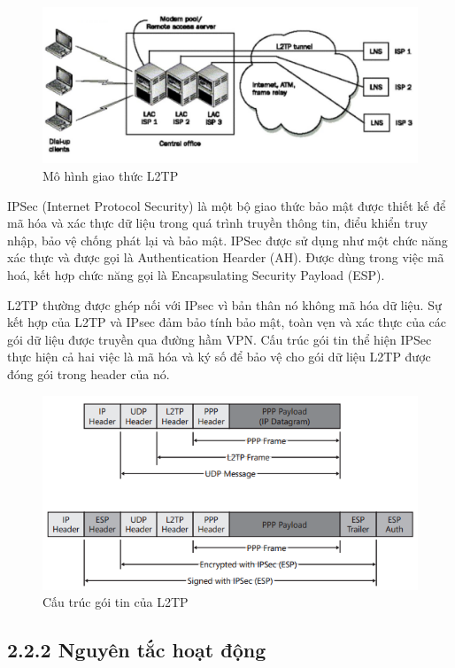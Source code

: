   \begin{figure}[htbp]
        \centering
        \includegraphics[width=0.8\linewidth]{img/l2tp.jpeg}
        \caption{Mô hình giao thức L2TP}
    \end{figure}

 IPSec (Internet Protocol Security) là một bộ giao thức bảo mật được thiết kế để mã hóa và xác thực dữ liệu trong quá trình truyền thông tin, điểu khiển truy nhập, bảo vệ chống phát lại và bảo mật. IPSec được sử dụng như một chức năng xác thực và được gọi là Authentication Hearder (AH). Được dùng trong việc mã hoá, kết hợp chức năng gọi là Encapsulating Security Payload (ESP).

 L2TP thường được ghép nối với IPsec vì bản thân nó không mã hóa dữ liệu. Sự kết hợp của L2TP và IPsec đảm bảo tính bảo mật, toàn vẹn và xác thực của các gói dữ liệu được truyền qua đường hầm VPN. Cấu trúc gói tin thể hiện IPSec thực hiện cả hai việc là mã hóa và ký số để bảo vệ cho gói dữ liệu L2TP được đóng gói trong header của nó.
 
 \begin{figure}[htbp]
        \centering
        \includegraphics[width=0.7\linewidth]{img/l2tp-packet-structure.png}
        \caption{Cấu trúc gói tin của L2TP}
    \end{figure}

 \subsection*{2.2.2 Nguyên tắc hoạt động}

